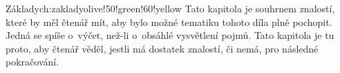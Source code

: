 \begin{chapterintro}{Základy}{ch:zaklady}{olive!50!green!60!yellow}{}
    Tato kapitola je souhrnem znalostí, které by měl čtenář mít, aby bylo možné
    tematiku tohoto díla plně pochopit.
    Jedná se spíše o~výčet, než-li o~obsáhlé vysvětlení pojmů.
    Tato kapitola je tu proto, aby čtenář věděl, jestli má dostatek znalostí,
    či nemá, pro následné pokračování.
\end{chapterintro}



